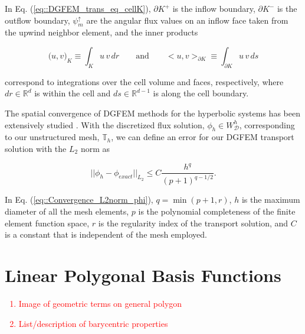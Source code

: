 \documentclass[preprint,10pt]{elsarticle}
\newcommand{\tcr}[1]{\textcolor{red}{#1}}
\begin{document}
\noindent In Eq. (\ref{eq::DGFEM_trans_eq_cellK}), $\partial K^+$ is the inflow boundary, $\partial K^-$ is the outflow boundary, $\psi^{\uparrow}_{m}$ are the angular flux values on an inflow face taken from the upwind neighbor element, and the inner products

\begin{equation}
\label{eq::spatial_inner_products_cell}
 \Big( u, v \Big)_K \equiv \int_K u \, v \, d r \qquad \text{and} \qquad  \Big< u, v \Big>_{\partial K} \equiv \int_{\partial K} u \, v \, d s
\end{equation} 

\noindent correspond to integrations over the cell volume and faces, respectively, where $dr \in \mathbb{R}^d$ is within the cell and $ds \in \mathbb{R}^{d-1}$ is along the cell boundary.

The spatial convergence of DGFEM methods for the hyperbolic systems has been extensively studied \cite{lesaint1974finite,houston2000stabilized,houston2002discontinuous,wang2009convergence}. With the discretized flux solution, $\phi_h \in W^h_{\mathcal{D}}$, corresponding to our unstructured mesh, $\mathbb{T}_h$, we can define an error for our DGFEM transport solution with the $L_2$ norm as

\begin{equation}
\label{eq::Convergence_L2norm_phi}
|| \phi_h - \phi_{exact} ||_{L_2} \leq C \frac{h^{q}}{(p+1)^{q-1/2}} .
\end{equation}

\noindent In Eq. (\ref{eq::Convergence_L2norm_phi}), $q = \min (p+1, r )$, $h$ is the maximum diameter of all the mesh elements, $p$ is the polynomial completeness of the finite element function space, $r$ is the regularity index of the transport solution, and $C$ is a constant that is independent of the mesh employed.

\section{Linear Polygonal Basis Functions} \label{sec::linpoly}
\tcr
{
\begin{enumerate}
\item Image of geometric terms on general polygon
\item List/description of barycentric properties
\end{enumerate}
}
\end{document}
